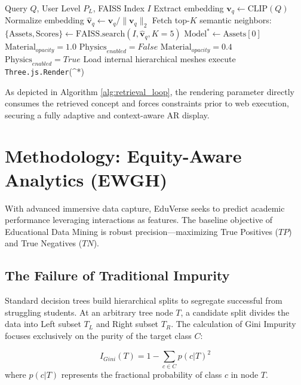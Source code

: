 \documentclass[conference]{IEEEtran}
\begin{document}
\begin{algorithm}[h]
\caption{Retrieval \& Complexity Execution Loop}
\label{alg:retrieval_loop}
\begin{algorithmic}[1]
\REQUIRE Query $Q$, User Level $P_L$, FAISS Index $I$
\STATE Extract embedding $\mathbf{v}_q \leftarrow \text{CLIP}(Q)$
\STATE Normalize embedding $\hat{\mathbf{v}}_q \leftarrow \mathbf{v}_q / \|\mathbf{v}_q\|_2$
\STATE Fetch top-$K$ semantic neighbors: 
\STATE $\{\text{Assets}, \text{Scores}\} \leftarrow \text{FAISS.search}(I, \hat{\mathbf{v}}_q, K=5)$
\STATE $\text{Model}^* \leftarrow \text{Assets}[0]$
    \STATE $\text{Material}_{opacity} = 1.0$
    \STATE $\text{Physics}_{enabled} = False$
    \STATE $\text{Material}_{opacity} = 0.4$ 
    \STATE $\text{Physics}_{enabled} = True$
    \STATE Load internal hierarchical meshes
\ENDIF
\STATE execute \texttt{Three.js.Render}(^*)
\end{algorithmic}
\end{algorithm}

As depicted in Algorithm \ref{alg:retrieval_loop}, the rendering parameter directly consumes the retrieved concept and forces constraints prior to web execution, securing a fully adaptive and context-aware AR display.

\section{Methodology: Equity-Aware Analytics (EWGH)}
\label{sec:ewgh}

With advanced immersive data capture, EduVerse seeks to predict academic performance leveraging interactions as features. The baseline objective of Educational Data Mining is robust precision—maximizing True Positives ($TP$) and True Negatives ($TN$).

\subsection{The Failure of Traditional Impurity}

Standard decision trees build hierarchical splits to segregate successful from struggling students. At an arbitrary tree node $T$, a candidate split divides the data into Left subset $T_L$ and Right subset $T_R$. The calculation of Gini Impurity focuses exclusively on the purity of the target class $C$:

\begin{equation}
I_{Gini}(T) = 1 - \sum_{c \in C} p(c | T)^2
\end{equation}
where $p(c | T)$ represents the fractional probability of class $c$ in node $T$.
\end{document}

